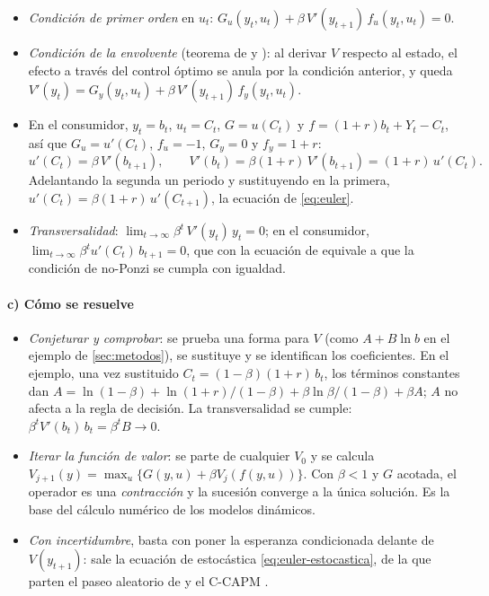 \documentclass[11pt]{article}
\begin{document}
\begin{itemize}
\item \emph{Condición de primer orden} en $u_t$: $G_u(y_t,u_t)+\beta\,V'(y_{t+1})\,f_u(y_t,u_t)=0$.
\item \emph{Condición de la envolvente} (teorema de  y ): al derivar $V$ respecto al estado, el efecto a través del control óptimo se anula por la condición anterior, y queda $V'(y_t)=G_y(y_t,u_t)+\beta\,V'(y_{t+1})\,f_y(y_t,u_t)$.
\item En el consumidor, $y_t=b_t$, $u_t=C_t$, $G=u(C_t)$ y $f=(1+r)b_t+Y_t-C_t$, así que $G_u=u'(C_t)$, $f_u=-1$, $G_y=0$ y $f_y=1+r$:
  \begin{equation*}
  u'(C_t)=\beta\,V'(b_{t+1}),\qquad V'(b_t)=\beta(1+r)\,V'(b_{t+1})=(1+r)\,u'(C_t).
  \end{equation*}
  Adelantando la segunda un periodo y sustituyendo en la primera, $u'(C_t)=\beta(1+r)\,u'(C_{t+1})$, la ecuación de  \eqref{eq:euler}. \findemo
\item \emph{Transversalidad}: $\lim_{t\to\infty}\beta^t\,V'(y_t)\,y_t=0$; en el consumidor, $\lim_{t\to\infty}\beta^tu'(C_t)\,b_{t+1}=0$, que con la ecuación de  equivale a que la condición de no-Ponzi se cumpla con igualdad.
\end{itemize}

\paragraph{c) Cómo se resuelve}

\begin{itemize}
\item \emph{Conjeturar y comprobar}: se prueba una forma para $V$ (como $A+B\ln b$ en el ejemplo de \ref{sec:metodos}), se sustituye y se identifican los coeficientes. En el ejemplo, una vez sustituido $C_t=(1-\beta)(1+r)\,b_t$, los términos constantes dan $A=\ln(1-\beta)+\ln(1+r)/(1-\beta)+\beta\ln\beta/(1-\beta)+\beta A$; $A$ no afecta a la regla de decisión. La transversalidad se cumple: $\beta^tV'(b_t)\,b_t=\beta^tB\to0$.
\item \emph{Iterar la función de valor}: se parte de cualquier $V_0$ y se calcula $V_{j+1}(y)=\max_u\{G(y,u)+\beta V_j(f(y,u))\}$. Con $\beta<1$ y $G$ acotada, el operador es una \emph{contracción} y la sucesión converge a la única solución\nocite{StokeyLucas1989Recursive}. Es la base del cálculo numérico de los modelos dinámicos\nocite{LjungqvistSargent2018Recursive}.
\item \emph{Con incertidumbre}, basta con poner la esperanza condicionada delante de $V(y_{t+1})$: sale la ecuación de  estocástica \eqref{eq:euler-estocastica}, de la que parten el paseo aleatorio de  y el C-CAPM .
\end{itemize}
\end{document}

